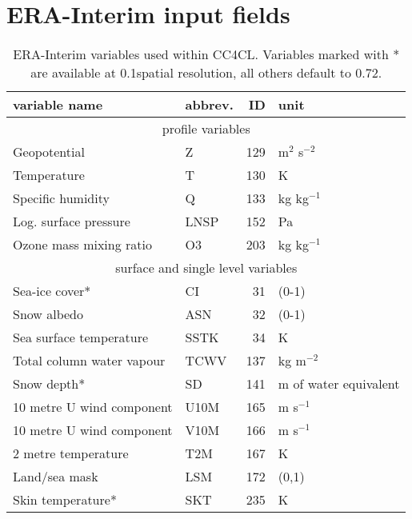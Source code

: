 \documentclass[amt]{copernicus}
\begin{document}
\section{ERA-Interim input fields}
\begin{table}[ht]
  \caption{ERA-Interim variables used within CC4CL. Variables marked with * are available at 0.1\textdegree spatial resolution, all others default to 0.72\textdegree.}
  \begin{tabular}{p{3.8cm}|l|r|p{1.5cm}}
    \hline
    variable name & abbrev. & ID & unit \\
    \hline
    \multicolumn{4}{c}{profile variables} \\
    \hline
    Geopotential & Z & 129 & m$^2$ s$^{-2}$ \\
    Temperature  & T & 130 & K \\
    Specific humidity & Q & 133 & kg kg$^{-1}$ \\
    Log. surface pressure & LNSP & 152 & Pa \\
    Ozone mass mixing ratio & O3 & 203 & kg kg$^{-1}$ \\
    \hline
    \multicolumn{4}{c}{surface and single level variables} \\
    \hline
    Sea-ice cover* & CI & 31 & (0-1) \\
    Snow albedo & ASN & 32 & (0-1) \\
    Sea surface temperature & SSTK & 34 & K \\
    Total column water vapour & TCWV & 137 & kg m$^{-2}$ \\
    Snow depth* & SD & 141 & m of water equivalent \\
    10 metre U wind component & U10M & 165 & m s$^{-1}$ \\
    10 metre U wind component & V10M & 166 & m s$^{-1}$ \\
    2 metre temperature & T2M & 167 & K \\
    Land/sea mask & LSM & 172 & (0,1) \\
    Skin temperature* & SKT & 235 & K \\
    \hline
  \end{tabular}
  \label{tab:ERA-Interim}
\end{table}
\end{document}
